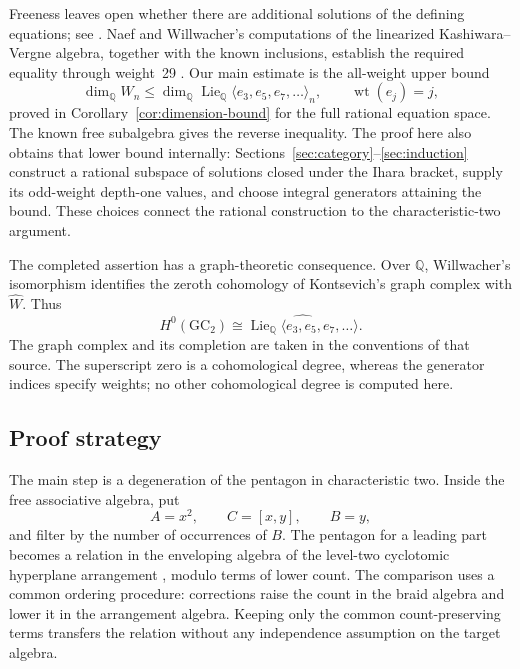 \documentclass[11pt]{article}
\theoremstyle{definition}
\theoremstyle{remark}
\numberwithin{equation}{section}
\begin{document}
Freeness leaves open whether there are additional solutions of the
defining equations; see \cite[Section~9]{Willwacher}.
Naef and Willwacher's computations of the linearized
Kashiwara--Vergne algebra, together with the known inclusions,
establish the required equality through weight~29
\cite[Theorem~5 and Corollary~7]{NaefWillwacher}.
Our main estimate is the all-weight upper bound
\[
 \dim_{\mathbb Q}W_n\leq
 \dim_{\mathbb Q}\operatorname{Lie}_{\mathbb Q}\langle e_3,e_5,e_7,\ldots\rangle_n,
 \qquad \operatorname{wt}(e_j)=j,
\]
proved in Corollary~\ref{cor:dimension-bound} for the full rational
equation space.  The known free subalgebra gives the reverse inequality.
The proof here also obtains that lower bound internally:
Sections~\ref{sec:category}--\ref{sec:induction} construct a rational
subspace of solutions closed under the Ihara bracket, supply its
odd-weight depth-one values, and choose integral generators attaining
the bound.  These choices connect the rational construction to the
characteristic-two argument.

The completed assertion has a graph-theoretic consequence.  Over
\(\mathbb Q\), Willwacher's isomorphism
\cite[Theorem~1.1]{Willwacher} identifies the zeroth cohomology of
Kontsevich's graph complex with \(\widehat W\).  Thus
\[
 H^0(\mathrm{GC}_2)\cong
 \widehat{\operatorname{Lie}_{\mathbb Q}\langle e_3,e_5,e_7,\ldots\rangle}.
\]
The graph complex and its completion are taken in the conventions of
that source.  The superscript zero is a cohomological degree, whereas
the generator indices specify weights; no other cohomological degree
is computed here.

\subsection{Proof strategy}

The main step is a degeneration of the pentagon in characteristic two.
Inside the free associative algebra, put
\[
 A=x^2,\qquad C=[x,y],\qquad B=y,
\]
and filter by the number of occurrences of \(B\).
The pentagon for a leading part becomes a relation in the enveloping
algebra of the level-two cyclotomic hyperplane arrangement
\cite[Section~1.4]{Enriquez}, modulo terms of lower count.
The comparison uses a common ordering procedure: corrections
raise the count in the braid algebra and lower it in the arrangement
algebra.  Keeping only the common count-preserving terms transfers the
relation without any independence assumption on the target algebra.
\end{document}
